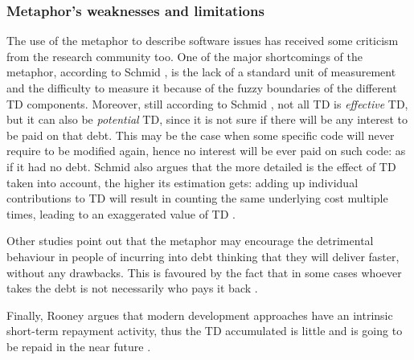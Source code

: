 \subsubsection{Metaphor's weaknesses and limitations}
The use of the metaphor to describe software issues has received some criticism from the research community too.
One of the major shortcomings of the metaphor, according to Schmid \cite{schmid_limitstd_2013}, is the lack of a standard unit of measurement and the difficulty to measure it because of the fuzzy boundaries of the different TD components.
Moreover, still according to Schmid \cite{schmid_limitstd_2013}, not all TD is \textit{effective} TD, but it can also be \textit{potential} TD, since it is not sure if there will be any interest to be paid on that debt.
This may be the case when some specific code will never require to be modified again, hence no interest will be ever paid on such code: as if it had no debt.
Schmid also argues that the more detailed is the effect of TD taken into account, the higher its estimation gets: adding up individual contributions to TD will result in counting the same underlying cost multiple times, leading to an exaggerated value of TD \cite{schmid_limitstd_2013}.

Other studies point out that the metaphor may encourage the detrimental behaviour in people of incurring into debt thinking that they will deliver faster, without any drawbacks. This is favoured by the fact that in some cases whoever takes the debt is not necessarily who pays it back \cite{allman_tdm_2012}.

Finally, Rooney argues that modern development approaches have an intrinsic short-term repayment activity, thus the TD accumulated is little and is going to be repaid in the near future \cite{rooney2010technical}.

